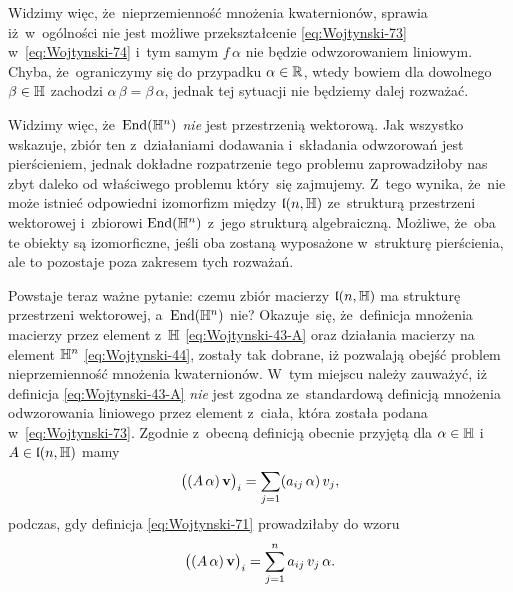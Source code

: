 \documentclass[a4paper,11pt]{article}
\begin{document}
Widzimy więc, że~nieprzemienność mnożenia kwaternionów, sprawia
iż~w~ogólności nie jest możliwe przekształcenie \eqref{eq:Wojtynski-73}
w~\eqref{eq:Wojtynski-74} i~tym samym $f \, \alpha$ nie będzie odwzorowaniem
liniowym. Chyba, że~ograniczymy się do przypadku $\alpha \in \mathbb{R}$, wtedy bowiem
dla dowolnego $\beta \in \mathbb{H}$ zachodzi $\alpha \, \beta = \beta \, \alpha$, jednak tej sytuacji
nie będziemy dalej rozważać.

Widzimy więc, że~$\mathrm{End}( \mathbb{H}^{ n } )$ \textit{nie} jest przestrzenią
wektorową. Jak wszystko wskazuje, zbiór ten z~działaniami dodawania
i~składania odwzorowań jest pierścieniem, jednak dokładne rozpatrzenie tego
problemu zaprowadziłoby nas zbyt daleko od właściwego problemu który~się
zajmujemy. Z~tego wynika, że~nie może istnieć odpowiedni izomorfizm między
$\mathfrak{l}( n, \mathbb{H} )$ ze~strukturą przestrzeni wektorowej
i~zbiorowi $\mathrm{End}( \mathbb{H}^{ n } )$ z~jego strukturą algebraiczną. Możliwe,
że~oba te obiekty są izomorficzne, jeśli oba zostaną wyposażone w~strukturę
pierścienia, ale to pozostaje poza zakresem tych rozważań.

Powstaje teraz ważne pytanie: czemu zbiór macierzy $\mathfrak{l}( n, \mathbb{H} )$ ma
strukturę przestrzeni wektorowej, a~$\mathrm{End}( \mathbb{H}^{ n } )$ nie? Okazuje~się,
że~definicja mnożenia macierzy przez element z~$\mathbb{H}$
\eqref{eq:Wojtynski-43-A} oraz działania macierzy na element $\mathbb{H}^{ n }$
\eqref{eq:Wojtynski-44}, zostały tak dobrane, iż pozwalają obejść problem
nieprzemienność mnożenia kwaternionów. W~tym miejscu należy zauważyć, iż
definicja \eqref{eq:Wojtynski-43-A} \textit{nie} jest zgodna ze~standardową
definicją mnożenia odwzorowania liniowego przez element z~ciała, która
została podana w~\eqref{eq:Wojtynski-73}. Zgodnie z~obecną definicją
obecnie przyjętą dla $\alpha \in \mathbb{H}$ i~$A \in \mathfrak{l}( n, \mathbb{H} )$ mamy
\begin{equation}
  \label{eq:Wojtynski-78}
  \big( ( A \, \alpha ) \, \mathbf{v} \big)_{ i } =
  \sum_{ j = 1 } ( a_{ i j } \, \alpha ) \, v_{ j },
\end{equation}
podczas, gdy definicja \eqref{eq:Wojtynski-71} prowadziłaby do wzoru
\begin{equation}
  \label{eq:Wojtynsk-79}
  \big( ( A \, \alpha ) \, \mathbf{v} \big)_{ i } =
  \sum_{ j = 1 }^{ n } a_{ i j } \, v_{ j } \, \alpha.
\end{equation}
\end{document}
